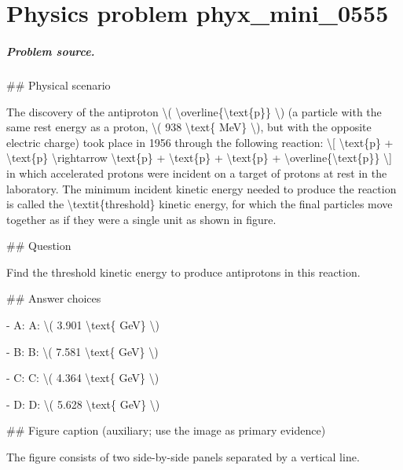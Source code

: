 
\chapter{Physics problem phyx\_mini\_0555}
\label{ch:PhyXMiniProblems_problem_phyx_mini_0555}

\paragraph{Problem source.}
\#\# Physical scenario

The discovery of the antiproton \textbackslash{}( \textbackslash{}overline\{\textbackslash{}text\{p\}\} \textbackslash{}) (a particle with the same rest energy as a proton, \textbackslash{}( 938 \textbackslash{}text\{ MeV\} \textbackslash{}), but with the opposite electric charge) took place in 1956 through the following reaction:
\textbackslash{}[ \textbackslash{}text\{p\} + \textbackslash{}text\{p\} \textbackslash{}rightarrow \textbackslash{}text\{p\} + \textbackslash{}text\{p\} + \textbackslash{}text\{p\} + \textbackslash{}overline\{\textbackslash{}text\{p\}\} \textbackslash{}]
in which accelerated protons were incident on a target of protons at rest in the laboratory. The minimum incident kinetic energy needed to produce the reaction is called the \textbackslash{}textit\{threshold\} kinetic energy, for which the final particles move together as if they were a single unit as shown in figure.

\#\# Question

Find the threshold kinetic energy to produce antiprotons in this reaction.

\#\# Answer choices

- A: A: \textbackslash{}( 3.901 \textbackslash{}text\{ GeV\} \textbackslash{})

- B: B: \textbackslash{}( 7.581 \textbackslash{}text\{ GeV\} \textbackslash{})

- C: C: \textbackslash{}( 4.364 \textbackslash{}text\{ GeV\} \textbackslash{})

- D: D: \textbackslash{}( 5.628 \textbackslash{}text\{ GeV\} \textbackslash{})

\#\# Figure caption (auxiliary; use the image as primary evidence)

The figure consists of two side-by-side panels separated by a vertical line.

